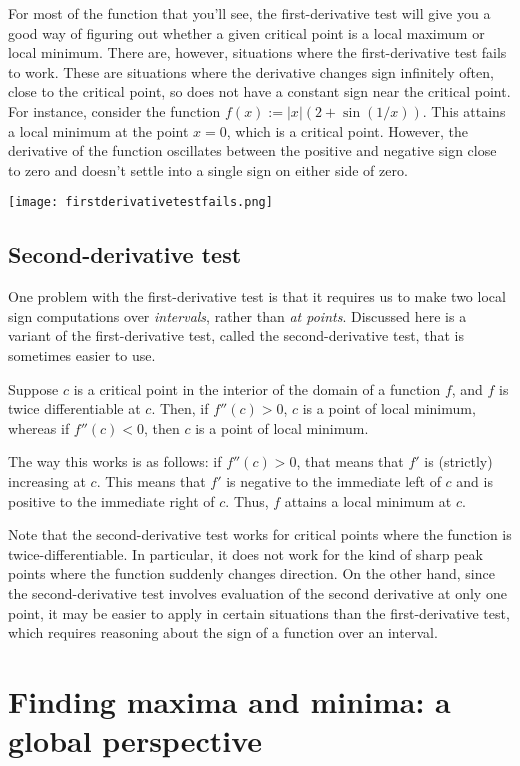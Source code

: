 \documentclass{amsart}
\begin{document}
For most of the function that you'll see, the first-derivative test
will give you a good way of figuring out whether a given critical
point is a local maximum or local minimum. There are, however,
situations where the first-derivative test fails to work. These are
situations where the derivative changes sign infinitely often, close
to the critical point, so does not have a constant sign near the
critical point. For instance, consider the function $f(x) := |x| (2 +
\sin(1/x))$. This attains a local minimum at the point $x = 0$, which
is a critical point. However, the derivative of the function
oscillates between the positive and negative sign close to zero and
doesn't settle into a single sign on either side of zero.

\texttt{[image: firstderivativetestfails.png]}

\subsection{Second-derivative test}

One problem with the first-derivative test is that it requires us to
make two local sign computations over {\em intervals}, rather than
{\em at points}. Discussed here is a variant of the first-derivative
test, called the second-derivative test, that is sometimes easier to
use.

Suppose $c$ is a critical point in the interior of the domain of a
function $f$, and $f$ is twice differentiable at $c$. Then, if $f''(c)
> 0$, $c$ is a point of local minimum, whereas if $f''(c) < 0$, then
$c$ is a point of local minimum.

The way this works is as follows: if $f''(c) > 0$, that means that
$f'$ is (strictly) increasing at $c$. This means that $f'$ is negative
to the immediate left of $c$ and is positive to the immediate right of
$c$. Thus, $f$ attains a local minimum at $c$.

Note that the second-derivative test works for critical points where
the function is twice-differentiable. In particular, it does not work
for the kind of sharp peak points where the function suddenly changes
direction. On the other hand, since the second-derivative test
involves evaluation of the second derivative at only one point, it may
be easier to apply in certain situations than the first-derivative
test, which requires reasoning about the sign of a function over an
interval.

\section{Finding maxima and minima: a global perspective}
\end{document}
